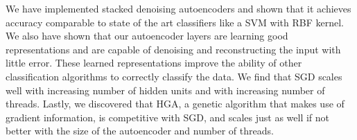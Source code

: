 We have implemented stacked denoising autoencoders and shown that it achieves accuracy comparable to state of the art classifiers like a SVM with RBF kernel. We also have shown that our autoencoder layers are learning good representations and are capable of denoising and reconstructing the input with little error. These learned representations improve the ability of other classification algorithms to correctly classify the data. We find that SGD scales well with increasing number of hidden units and with increasing number of threads. Lastly, we discovered that HGA, a genetic algorithm that makes use of gradient information, is competitive with SGD, and scales just as well if not better with the size of the autoencoder and number of threads. 
